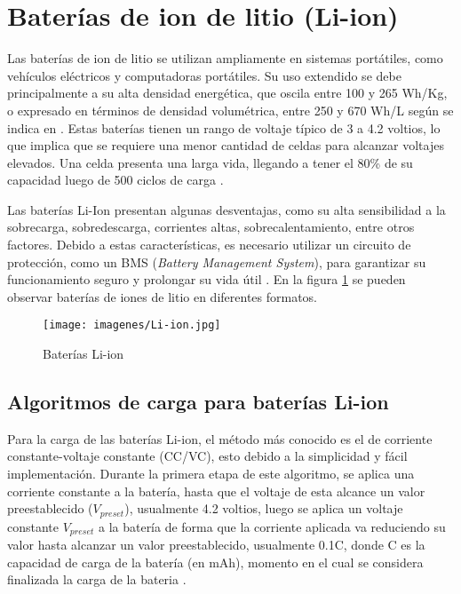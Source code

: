 \section{Baterías de ion de litio (Li-ion)}

Las baterías de ion de litio se utilizan ampliamente en sistemas portátiles,
 como vehículos eléctricos y computadoras portátiles. Su uso extendido se 
 debe principalmente a su alta densidad energética, que oscila entre 100 y 265 Wh/Kg,
  o expresado en términos de densidad volumétrica, entre 250 y 670 Wh/L según se indica en 
  \cite{noauthor_lithium-ion_nodate}. Estas baterías tienen un rango de voltaje típico de
   3 a 4.2 voltios, lo que implica que se requiere una menor cantidad de celdas para
alcanzar voltajes elevados. Una celda presenta una larga vida, llegando a tener el 80\%
de su capacidad luego de 500 ciclos de carga \cite{texas_instrumens_multi-chemistry_2022}.


Las baterías Li-Ion presentan algunas desventajas, como su alta sensibilidad a la sobrecarga,
sobredescarga, corrientes altas, sobrecalentamiento, entre otros factores. Debido a estas características,
es necesario utilizar un circuito de protección, como un BMS (\textit{Battery Management System}), para garantizar
su funcionamiento seguro y prolongar su vida útil \cite{texas_instrumens_multi-chemistry_2022}. En la figura 
\ref{fig:liion} se pueden observar baterías de iones de litio en diferentes formatos.

\begin{figure}[H]
   \centering
   \texttt{[image: imagenes/Li-ion.jpg]}
   \caption{Baterías Li-ion \cite{mk2010_english_2012} }
   \label{fig:liion}
\end{figure}


\subsection{Algoritmos de carga para baterías Li-ion}
\label{sec:alg_lion}
Para la carga de las baterías Li-ion, el método más conocido es el de corriente constante-voltaje constante (CC/VC), esto 
debido a la simplicidad y fácil implementación. Durante la primera etapa de este algoritmo, se aplica una corriente constante
a la batería, hasta que el voltaje de esta alcance un valor preestablecido ($V_{preset}$), usualmente 4.2 voltios, luego se aplica 
un voltaje constante $V_{preset}$ a la batería de forma que la corriente aplicada va reduciendo su valor hasta alcanzar un valor
preestablecido, usualmente 0.1C, donde C es la capacidad de carga de la batería (en mAh), momento en el cual se considera finalizada la 
carga de la bateria \cite{shen_charging_2012}.

